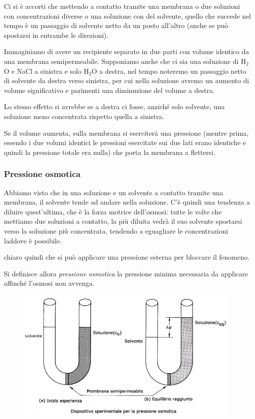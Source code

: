\vspace{0.3cm}Ci si è accorti che mettendo a contatto tramite una membrana o due soluzioni con concentrazioni diverse o una soluzione con del solvente, quello che succede nel tempo è un passaggio di solvente netto da un posto all'altro (anche se può spostarsi in entrambe le direzioni).

Immaginiamo di avere un recipiente separato in due parti con volume identico da una membrana semipermeabile. Supponiamo anche che ci sia una soluzione di H$_2$O e NaCl a sinistra e solo H$_2$O a destra, nel tempo noteremo un passaggio netto di solvente da destra verso sinistra, per cui nella soluzione avremo un aumento di volume significativo e parimenti una diminuzione del volume a destra.

Lo stesso effetto si avrebbe se a destra ci fosse, anziché solo solvente, una soluzione meno concentrata rispetto quella a sinistra.

Se il volume aumenta, sulla membrana si eserciterà una pressione (mentre prima, essendo i due volumi identici le pressioni esercitate sui due lati erano identiche e quindi la pressione totale era nulla) che porta la membrana a flettersi.
\subsubsection{Pressione osmotica}
Abbiamo visto che in una soluzione e un solvente a contatto tramite una membrana, il solvente tende ad andare nella soluzione. C'è quindi una tendenza a diluire quest'ultima, che è la forza motrice dell'osmosi: tutte le volte che mettiamo due soluzioni a contatto, la più diluita vedrà il suo solvente spostarsi verso la soluzione più concentrata, tendendo a eguagliare le concentrazioni laddove è possibile.

\E chiaro quindi che si può applicare una pressione esterna per bloccare il fenomeno.

Si definisce allora \textit{pressione osmotica} la pressione minima necessaria da applicare affinché l'osmosi non avvenga.

\begin{figure}[htp]
    \centering
    \includegraphics[width=11cm]{immagini/tubo_a_U.png}
\end{figure}

